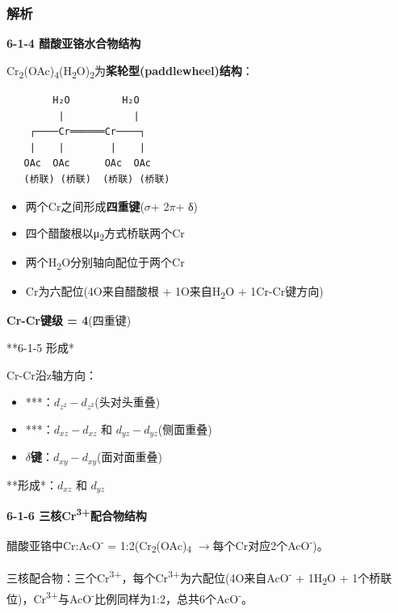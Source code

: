\documentclass[a4paper,11pt]{ctexart}
\providecommand{\tightlist}{\setlength{\itemsep}{0pt}\setlength{\parskip}{0pt}}
\newcommand{\箭}{\ensuremath{\rightarrow}}
\newcommand{\左箭}{\ensuremath{\leftarrow}}
\newcommand{\上箭}{\ensuremath{\uparrow}}
\newcommand{\下箭}{\ensuremath{\downarrow}}
\newcommand{\衡}{\ensuremath{\rightleftharpoons}}
\newcommand{\双箭}{\ensuremath{\leftrightarrow}}
\newcommand{\约等于}{\ensuremath{\approx}}
\newcommand{\小于等于}{\ensuremath{\leq}}
\newcommand{\大于等于}{\ensuremath{\geq}}
\newcommand{\不等于}{\ensuremath{\neq}}
\newcommand{\西格马}{\ensuremath{\sigma}}
\newcommand{\派}{\ensuremath{\pi}}
\begin{document}
\subsubsection{解析}\label{ux89e3ux6790-21}

\textbf{6-1-4 醋酸亚铬水合物结构}

Cr\textsubscript{2}(OAc)\textsubscript{4}(H\textsubscript{2}O)\textsubscript{2}为\textbf{桨轮型(paddlewheel)结构}：

\begin{verbatim}
        H₂O         H₂O
         |            |
    ┌────Cr══════Cr────┐
    |    |        |    |
   OAc  OAc      OAc  OAc
   (桥联) (桥联)  (桥联) (桥联)
\end{verbatim}

\begin{itemize}
\tightlist
\item
  两个Cr之间形成\textbf{四重键}(\西格马 + 2\派 + δ)
\item
  四个醋酸根以μ\textsubscript{2}方式桥联两个Cr
\item
  两个H\textsubscript{2}O分别轴向配位于两个Cr
\item
  Cr为六配位(4O来自醋酸根 + 1O来自H\textsubscript{2}O + 1Cr-Cr键方向)
\end{itemize}

\textbf{Cr-Cr键级 = 4}(四重键)

**6-1-5 形成*

Cr-Cr沿z轴方向：

\begin{itemize}
\tightlist
\item
  ***：\(d_{z^2} - d_{z^2}\)(头对头重叠)
\item
  ***：\(d_{xz} - d_{xz}\) 和 \(d_{yz} - d_{yz}\)(侧面重叠)
\item
  \textbf{\(\delta\)键}：\(d_{xy} - d_{xy}\)(面对面重叠)
\end{itemize}

**形成*：\(d_{xz}\) 和 \(d_{yz}\)

\textbf{6-1-6 三核Cr\textsuperscript{3+}配合物结构}

醋酸亚铬中Cr:AcO\textsuperscript{-} = 1:2(Cr\textsubscript{2}(OAc)\textsubscript{4} \箭 每个Cr对应2个AcO\textsuperscript{-})。

三核配合物：三个Cr\textsuperscript{3+}，每个Cr\textsuperscript{3+}为六配位(4O来自AcO\textsuperscript{-} + 1H\textsubscript{2}O + 1个桥联位)，Cr\textsuperscript{3+}与AcO\textsuperscript{-}比例同样为1:2，总共6个AcO\textsuperscript{-}。
\end{document}
